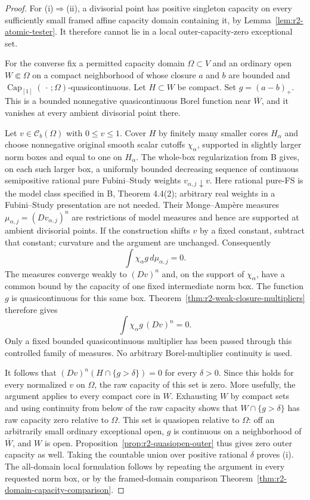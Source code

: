 \documentclass[11pt,a4paper]{article}
\numberwithin{equation}{section}
\theoremstyle{definition}
\theoremstyle{remark}
\newcommand{\Cb}{\mathcal C_b}
\begin{document}
\begin{proof}
For (i)$\Rightarrow$(ii), a divisorial point has positive
singleton capacity on every sufficiently small framed affine
capacity domain containing it, by Lemma~\ref{lem:r2-atomic-tester}.
It therefore cannot lie in a local outer-capacity-zero
exceptional set.

For the converse fix a permitted capacity domain $\Omega\subset V$
and an ordinary open $W\Subset\Omega$ on a compact neighborhood
of whose closure $a$ and $b$ are bounded and
$\operatorname{Cap}_{[1]}(\,\cdot\,;\Omega)$-quasicontinuous.
Let $H\subset W$ be compact. Set $g=(a-b)_+$. This is a bounded
nonnegative quasicontinuous Borel function near $\overline W$,
and it vanishes at every ambient divisorial point there.

Let $v\in\Cb(\Omega)$ with $0\leq v\leq1$. Cover $H$ by finitely
many smaller cores $H_\alpha$ and choose nonnegative original
smooth scalar cutoffs $\chi_\alpha$, supported in slightly
larger norm boxes and equal to one on $H_\alpha$.
The whole-box regularization from B gives, on each such larger
box, a uniformly bounded decreasing sequence of continuous
semipositive rational pure Fubini--Study weights
$v_{\alpha,j}\downarrow v$. Here rational pure-FS is the
model class specified in B, Theorem 4.4(2); arbitrary real
weights in a Fubini--Study presentation are not needed.
Their Monge--Amp\`ere measures
$\mu_{\alpha,j}=(Dv_{\alpha,j})^n$ are restrictions of model
measures and hence are supported at ambient divisorial points.
If the construction shifts $v$ by a fixed constant, subtract
that constant; curvature and the argument are unchanged.
Consequently
\[
 \int \chi_\alpha g\,d\mu_{\alpha,j}=0 .
\]
The measures converge weakly to $(Dv)^n$ and, on the support
of $\chi_\alpha$, have a common bound by the capacity of one
fixed intermediate norm box. The function $g$ is quasicontinuous
for this same box. Theorem~\ref{thm:r2-weak-closure-multipliers}
therefore gives
\[
 \int \chi_\alpha g\,(Dv)^n=0 .
\]
Only a fixed bounded quasicontinuous multiplier has been passed
through this controlled family of measures. No arbitrary
Borel-multiplier continuity is used.

It follows that $(Dv)^n(H\cap\{g>\delta\})=0$ for every
$\delta>0$. Since this holds for every normalized $v$ on
$\Omega$, the raw capacity of this set is zero. More usefully,
the argument applies to every compact core in $W$. Exhausting
$W$ by compact sets and using continuity from below of the raw
capacity shows that $W\cap\{g>\delta\}$ has raw capacity zero
relative to $\Omega$. This set is quasiopen relative to $\Omega$:
off an arbitrarily small ordinary exceptional open, $g$ is
continuous on a neighborhood of $\overline W$, and $W$ is open.
Proposition~\ref{prop:r2-quasiopen-outer} thus gives zero outer
capacity as well. Taking the countable union over positive
rational $\delta$ proves (i). The all-domain local
formulation follows by repeating the argument in every
requested norm box, or by the framed-domain comparison
Theorem~\ref{thm:r2-domain-capacity-comparison}.
\end{proof}
\end{document}
